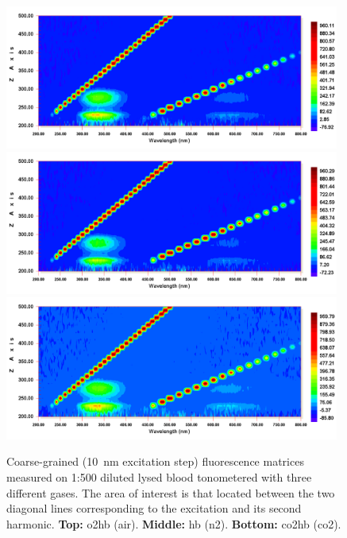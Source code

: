 \begin{figure}
	\centering
	\includegraphics[width=0.98\textwidth]{1_main_matter/co2hb_figures/fluorescence_matrices/coarse/o2.png}
	\includegraphics[width=0.98\textwidth]{1_main_matter/co2hb_figures/fluorescence_matrices/coarse/n2.png}
	\includegraphics[width=0.98\textwidth]{1_main_matter/co2hb_figures/fluorescence_matrices/coarse/co2.png}
	\caption[Coarse-grained haemoglobin fluorescence matrices.]{Coarse-grained (10~nm excitation step) fluorescence matrices measured on 1:500 diluted lysed blood tonometered with three different gases. The area of interest is that located between the two diagonal lines corresponding to the excitation and its second harmonic. \textbf{Top:} \gls{o2hb} (air). \textbf{Middle:} \gls{hb} (\gls{n2}). \textbf{Bottom:} \gls{co2hb} (\gls{co2}).}
	\label{fig:co2hb:fluo_matrix_coarse}
\end{figure}

